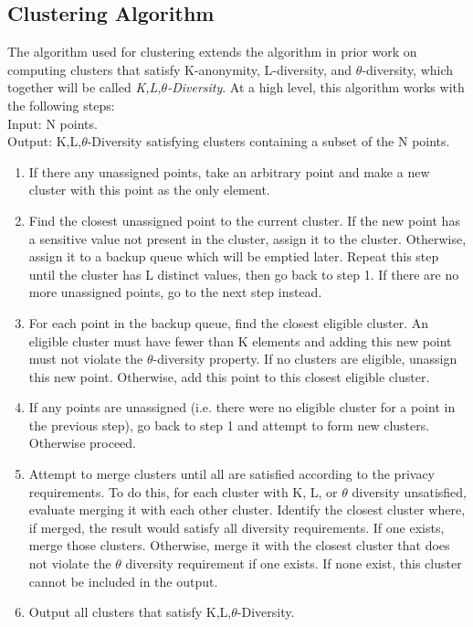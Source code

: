 \subsection{Clustering Algorithm}
The algorithm used for clustering extends the algorithm in prior work\cite{yangEnhanced} on computing clusters that satisfy K-anonymity, L-diversity, and $\theta$-diversity, which together will be called \emph{K,L,$\theta$-Diversity}. At a high level, this algorithm works with the following steps: \\
Input: N points. \\
Output: K,L,$\theta$-Diversity satisfying clusters containing a subset of the N points.
\begin{enumerate}
    \item If there any unassigned points, take an arbitrary point and make a new cluster with this point as the only element.
    \item Find the closest unassigned point to the current cluster. If the new point has a sensitive value not present in the cluster, assign it to the cluster. Otherwise, assign it to a backup queue which will be emptied later. Repeat this step until the cluster has L distinct values, then go back to step 1. If there are no more unassigned points, go to the next step instead.
    \item For each point in the backup queue, find the closest eligible cluster. An eligible cluster must have fewer than K elements and adding this new point must not violate the $\theta$-diversity property. If no clusters are eligible, unassign this new point. Otherwise, add this point to this closest eligible cluster.
    \item If any points are unassigned (i.e. there were no eligible cluster for a point in the previous step), go back to step 1 and attempt to form new clusters. Otherwise proceed.
    \item Attempt to merge clusters until all are satisfied according to the privacy requirements. To do this, for each cluster with K, L, or $\theta$ diversity unsatisfied, evaluate merging it with each other cluster. Identify the closest cluster where, if merged, the result would satisfy all diversity requirements. If one exists, merge those clusters. Otherwise, merge it with the closest cluster that does not violate the $\theta$ diversity requirement if one exists. If none exist, this cluster cannot be included in the output.
    \item Output all clusters that satisfy K,L,$\theta$-Diversity.
\end{enumerate}


